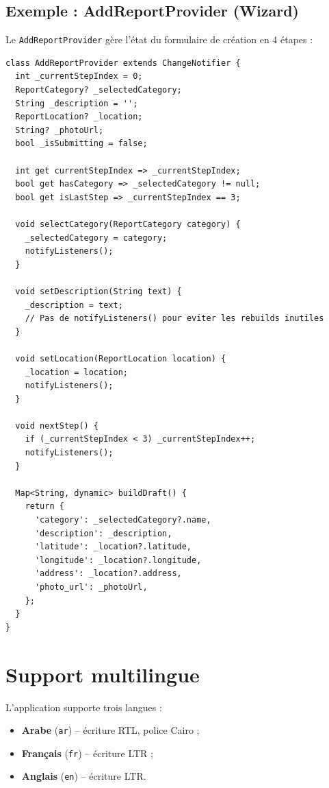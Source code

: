 \documentclass[12pt,a4paper]{report}
\begin{document}
\subsection{Exemple : AddReportProvider (Wizard)}

Le \texttt{AddReportProvider} gère l'état du formulaire de création en 4 étapes :

\begin{lstlisting}[style=codeblock, caption=Extrait d'AddReportProvider]
class AddReportProvider extends ChangeNotifier {
  int _currentStepIndex = 0;
  ReportCategory? _selectedCategory;
  String _description = '';
  ReportLocation? _location;
  String? _photoUrl;
  bool _isSubmitting = false;

  int get currentStepIndex => _currentStepIndex;
  bool get hasCategory => _selectedCategory != null;
  bool get isLastStep => _currentStepIndex == 3;

  void selectCategory(ReportCategory category) {
    _selectedCategory = category;
    notifyListeners();
  }

  void setDescription(String text) {
    _description = text;
    // Pas de notifyListeners() pour eviter les rebuilds inutiles
  }

  void setLocation(ReportLocation location) {
    _location = location;
    notifyListeners();
  }

  void nextStep() {
    if (_currentStepIndex < 3) _currentStepIndex++;
    notifyListeners();
  }

  Map<String, dynamic> buildDraft() {
    return {
      'category': _selectedCategory?.name,
      'description': _description,
      'latitude': _location?.latitude,
      'longitude': _location?.longitude,
      'address': _location?.address,
      'photo_url': _photoUrl,
    };
  }
}
\end{lstlisting}

\section{Support multilingue}

L'application supporte trois langues :
\begin{itemize}
    \item \textbf{Arabe} (\texttt{ar}) -- écriture RTL, police Cairo ;
    \item \textbf{Français} (\texttt{fr}) -- écriture LTR ;
    \item \textbf{Anglais} (\texttt{en}) -- écriture LTR.
\end{itemize}
\end{document}
